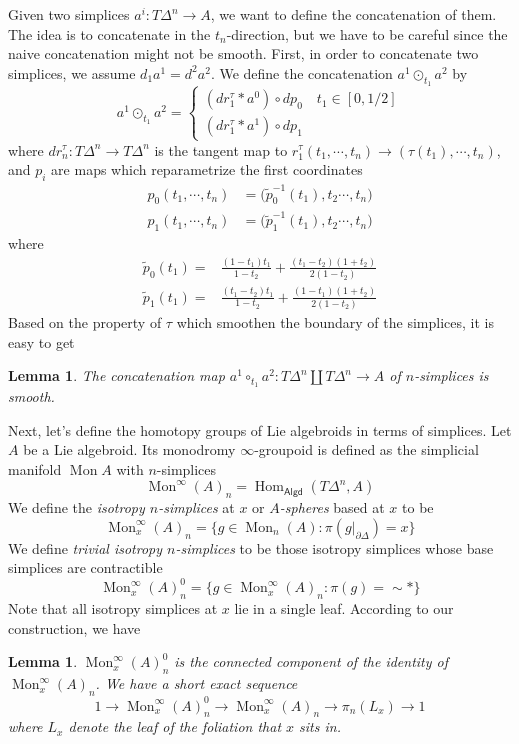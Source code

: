\documentclass[12pt]{amsart}
\newtheorem{lem}[thm]{Lemma}
\theoremstyle{definition}
\theoremstyle{remark}
\numberwithin{equation}{section}
\newcommand{\del}{\partial}
\renewcommand{\del}{\partial}
\newcommand{\1}{{\mathbb{1}}}
\newcommand{\algd}{\mathsf{Algd}}
\newcommand{\Hom}{\operatorname{Hom}}
\newcommand{\mon}{\operatorname{Mon}}
\begin{document}
Given two simplices $a^i: T \Delta^n \to A$, we want to define the concatenation of them. The idea is to concatenate in the $t_n$-direction, but we have to be careful since the naive concatenation might not be smooth. First, in order to concatenate two simplices, we assume $d_1 a^1 = d^2 a^2$. We define the concatenation $a^1 \odot_{t_1} a^2$ by 
$$
a^1 \odot_{t_1} a^2 = \begin{cases}
(dr_1^{\tau}* a^0) \circ dp_0 \quad t_1 \in [0, 1/2]\\
(dr_1^{\tau}* a^1) \circ dp_1
\end{cases}
$$
where $dr_n^{\tau}: T\Delta^n \to T \Delta^n$ is the tangent map to $r_1^{\tau} (t_1, \cdots, t_n) \to (\tau(t_1), \cdots, t_n)$, and $p_i$ are maps which reparametrize the first coordinates
\begin{align*}
    p_0(t_1, \cdots, t_n) &= \Big(\tilde{p}_0^{-1}(t_1), t_2 \cdots, t_n\Big)\\
    p_1(t_1, \cdots, t_n) &= \Big(\tilde{p}_1^{-1}(t_1), t_2\cdots, t_n\Big)
\end{align*}
where 
\begin{align*}
    \tilde{p}_0(t_1) =&  \frac{(1-t_1)t_1}{1-t_2} + \frac{(t_1 - t_2)(1+ t_2)}{2(1-t_2)}\\
    \tilde{p}_1(t_1) =&  \frac{(t_1 - t_2) t_1}{1 - t_2} + \frac{(1-t_1)(1 + t_2)}{2 (1-t_2)}
\end{align*}
Based on the property of $\tau$ which smoothen the boundary of the simplices, it is easy to get
\begin{lem}
    The concatenation map $a^1\circ_{t_1} a^2: T\Delta^n \coprod T\Delta^n \to A
    $ of $n$-simplices is smooth.
\end{lem}
Next, let's define the homotopy groups of Lie algebroids in terms of simplices.
Let $A$ be a Lie algebroid. Its monodromy $\infty$-groupoid is defined as the simplicial manifold $\mon A$ with $n$-simplices
\begin{equation*}
    \mon^{\infty}(A)_n = \Hom_{\algd}(T\Delta^n, A)
\end{equation*}
We define the {\it isotropy $n$-simplices} at $x$ or {\it $A$-spheres} based at $x$ to be
$$
\mon^{\infty}_x(A)_n = \{ g\in \mon_n(A): \pi (g|_{\del \Delta}) = x\}
$$
We define {\it trivial isotropy $n$-simplices} to be those isotropy simplices whose base simplices are contractible
$$
\mon^{\infty}_x(A)_n^0 = \{ g\in \mon^{\infty}_x(A)_n: \pi (g) =\sim  *\}
$$
Note that all isotropy simplices at $x$ lie in a single leaf. According to our construction, we have
\begin{lem}
    $\mon^{\infty}_x(A)_n^0$ is the connected component of the identity of $\mon^{\infty}_x(A)_n$. We have a short exact sequence
    \begin{equation*}
        1 \to \mon^{\infty}_x(A)_n^0 \to \mon^{\infty}_x(A)_n \to \pi_n(L_x) \to 1
    \end{equation*}
    where $L_x$ denote the leaf of the foliation that $x$ sits in.
\end{lem}
\end{document}
